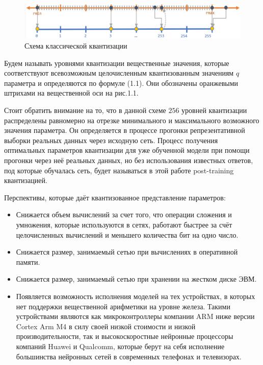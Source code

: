 \begin{figure}[H]
    \begin{center}
        \includegraphics[scale=0.3]{inc/img/q8.jpg}
        \caption{Схема классической квантизации}
    \end{center}
\end{figure}

Будем называть уровнями квантизации вещественные значения, которые соответствуют всевозможным целочисленным квантизованным значениям $q$ параметра и определяются по формуле (1.1). Они обозначены оранжевыми штрихами на вещественной оси на рис.1.1.

Стоит обратить внимание на то, что в данной схеме $256$ уровней квантизации  распределены равномерно на отрезке минимального и максимального возможного значения параметра. Он определяется в процессе прогонки репрезентативной выборки реальных данных через исходную сеть. Процесс получения оптимальных  параметров квантизации для уже обученной модели при помощи прогонки через неё реальных данных, но без использования известных ответов, под которые обучалась сеть, будет называться в этой работе post-training квантизацией.

Перспективы, которые даёт квантизованное представление параметров:
\begin{itemize}
    \item Снижается объем вычислений за счет того, что операции сложения и умножения, которые используются в сетях, работают быстрее за счёт целочисленных вычислений и меньшего количества бит на одно число.
    \item Снижается размер, занимаемый сетью при вычислениях в оперативной памяти.
    \item Снижается размер, занимаемый сетью при хранении на жестком диске ЭВМ.
    \item Появляется возможность исполнения моделей на тех устройствах, в которых нет поддержки вещественной арифметики на уровне железа. Такими устройствами являются как микроконтроллеры компании ARM ниже версии Cortex Arm M4 в силу своей низкой стоимости и низкой производительности, так и высокоскоростные нейронные процессоры компаний Huawei и Qualcomm, которые берут на себя исполнение большинства нейронных сетей в современных телефонах и телевизорах. 
\end{itemize}

